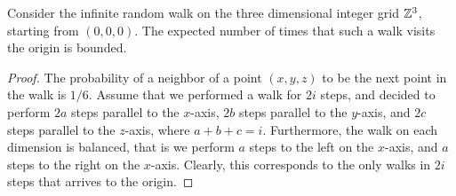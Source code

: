 \begin{lemma}
    Consider the infinite random walk on the three dimensional integer
    grid $\mathbb{Z}^3$, starting from $(0,0,0)$. The expected number of
    times that such a walk visits the origin is bounded.
\end{lemma}

\begin{proof}
    The probability of a neighbor of a point $(x,y,z)$ to be the next
    point in the walk is $1/6$. Assume that we performed a walk for
    $2i$ steps, and decided to perform $2a$ steps parallel to the
    $x$-axis, $2b$ steps parallel to the $y$-axis, and $2c$ steps
    parallel to the $z$-axis, where $a+b+c = i$. Furthermore, the walk
    on each dimension is balanced, that is we perform $a$ steps to the
    left on the $x$-axis, and $a$ steps to the right on the
    $x$-axis. Clearly, this corresponds to the only walks in $2i$
    steps that arrives to the origin.
    

\end{proof}
